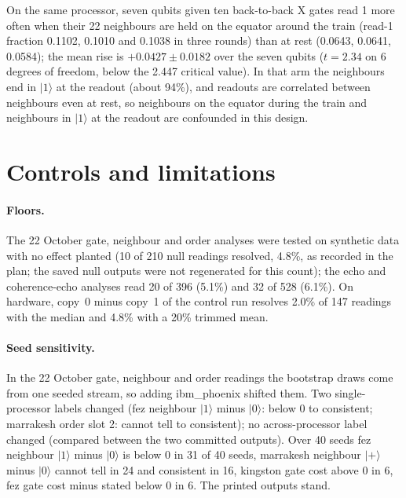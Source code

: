 \documentclass[reprint,amsmath,amssymb,aps,superscriptaddress,nofootinbib]{revtex4-2}
\begin{document}
On the same processor, seven qubits given ten back-to-back X gates read 1 more often when their 22 neighbours are held on the equator around the train (read-1 fraction 0.1102, 0.1010 and 0.1038 in three rounds) than at rest (0.0643, 0.0641, 0.0584); the mean rise is $+0.0427\pm0.0182$ over the seven qubits ($t=2.34$ on 6 degrees of freedom, below the 2.447 critical value). In that arm the neighbours end in $|1\rangle$ at the readout (about 94\%), and readouts are correlated between neighbours even at rest, so neighbours on the equator during the train and neighbours in $|1\rangle$ at the readout are confounded in this design.

\section{Controls and limitations}\label{sec:controls}

\paragraph*{Floors.} The 22 October gate, neighbour and order analyses were tested on synthetic data with no effect planted (10 of 210 null readings resolved, 4.8\%, as recorded in the plan; the saved null outputs were not regenerated for this count); the echo and coherence-echo analyses read 20 of 396 (5.1\%) and 32 of 528 (6.1\%). On hardware, copy~0 minus copy~1 of the control run resolves 2.0\% of 147 readings with the median and 4.8\% with a 20\% trimmed mean.

\paragraph*{Seed sensitivity.} In the 22 October gate, neighbour and order readings the bootstrap draws come from one seeded stream, so adding ibm\_phoenix shifted them. Two single-processor labels changed (fez neighbour $|1\rangle$ minus $|0\rangle$: below 0 to consistent; marrakesh order slot 2: cannot tell to consistent); no across-processor label changed (compared between the two committed outputs). Over 40 seeds fez neighbour $|1\rangle$ minus $|0\rangle$ is below 0 in 31 of 40 seeds, marrakesh neighbour $|+\rangle$ minus $|0\rangle$ cannot tell in 24 and consistent in 16, kingston gate cost above 0 in 6, fez gate cost minus stated below 0 in 6. The printed outputs stand.
\end{document}
